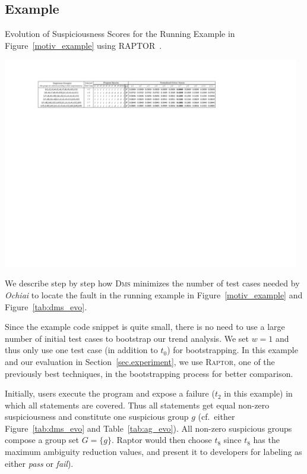 \subsection{Example}

\begin{table}[bp]
	\caption{Evolution of Suspiciousness Scores for the Running Example in Figure~\ref{motiv_example} using RAPTOR~\citep{Alberto2011}.}
\hspace*{-20pt}
    \includegraphics[width=13cm]{ag_table.pdf}
    \label{tab:ag_evo}
\end{table}


We describe step by step how \textsc{Dms} minimizes the number of test cases needed by {\em Ochiai} to locate
the fault in the running example in Figure~\ref{motiv_example} and Figure~\ref{tab:dms_evo}.

Since the example code snippet is quite small, there is no need to use a large number of initial test cases to bootstrap our trend analysis. %
We set $w=1$ and thus only use one test case (in addition to $t_0$) for bootstrapping. In this example and our evaluation in Section~\ref{sec.experiment}, we use \textsc{Raptor}, one of the previously best techniques, in the bootstrapping process for better comparison.

Initially, users execute the program and expose a failure ($t_2$ in this example) in which all statements are covered.
Thus all statements get equal non-zero suspiciousness and constitute one suspicious group $g$ (cf.\ either Figure~\ref{tab:dms_evo} and Table~\ref{tab:ag_evo}). All non-zero suspicious groups compose a group set $G = \{g\}$.
{\sc Raptor} would then choose $t_8$ since $t_8$ has the maximum ambiguity reduction values, and present it to developers for labeling as either {\em pass} or {\em fail}).


